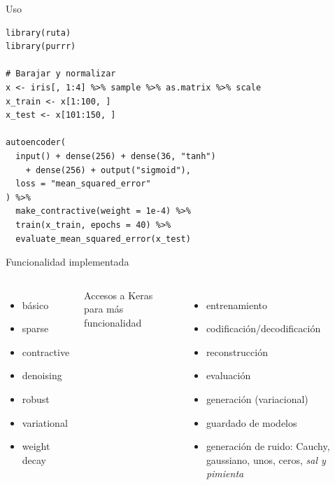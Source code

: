 \begin{frame}[fragile]{Uso}
\scriptsize
\begin{verbatim}
library(ruta)
library(purrr)

# Barajar y normalizar
x <- iris[, 1:4] %>% sample %>% as.matrix %>% scale
x_train <- x[1:100, ]
x_test <- x[101:150, ]

autoencoder(
  input() + dense(256) + dense(36, "tanh")
    + dense(256) + output("sigmoid"),
  loss = "mean_squared_error"
) %>%
  make_contractive(weight = 1e-4) %>%
  train(x_train, epochs = 40) %>%
  evaluate_mean_squared_error(x_test)
\end{verbatim}
\end{frame}

\begin{frame}{Funcionalidad implementada}

\begin{columns}[t]

\begin{itemize}
\item básico
\item
sparse
\item
contractive
\item
denoising
\item
robust
\item
variational
\item
weight decay
\end{itemize}

\alert{Accesos a Keras} para más funcionalidad

\begin{itemize}
\item entrenamiento
\item
codificación/decodificación
\item
reconstrucción
\item
evaluación
\item generación (variacional) 
\item
guardado de modelos
\item generación de ruido: Cauchy, gaussiano, unos, ceros, \emph{sal y pimienta}
\end{itemize}

\end{columns}
\end{frame}

